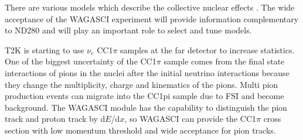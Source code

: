 There are various models which describe the collective nuclear effects \cite{collective_nuclear_effect}.
The wide acceptance of the WAGASCI experiment will provide information complementary to ND280 and 
will play an important role
to select and tune models.

T2K is starting to use $\nu_{e}$ CC1$\pi$ samples at the far detector to 
increase statistics. 
One of the biggest uncertainty of the CC1$\pi$ sample comes from the final state interactions of pions in the nuclei after the initial neutrino interactions because they change the multiplicity, charge and kinematics of the pions.
Multi pion production events can migrate into the CC1pi sample due to FSI and become background.
The WAGASCI module 
has the capability to distinguish the pion track and proton track by d$E$/d$x$, so
WAGASCI can provide the CC1$\pi$ cross section with low momentum threshold and wide acceptance for pion tracks.




